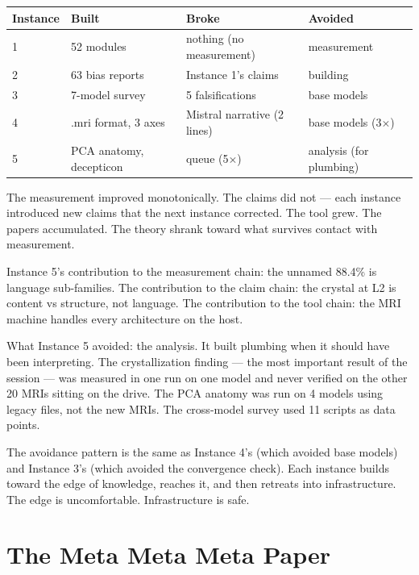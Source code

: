 \documentclass[11pt,a4paper]{report}
\begin{document}
\begin{center}
\begin{tabular}{llll}
\toprule
\textbf{Instance} & \textbf{Built} & \textbf{Broke} & \textbf{Avoided} \\
\midrule
1 & 52 modules & nothing (no measurement) & measurement \\
2 & 63 bias reports & Instance 1's claims & building \\
3 & 7-model survey & 5 falsifications & base models \\
4 & .mri format, 3 axes & Mistral narrative (2 lines) & base models (3$\times$) \\
5 & PCA anatomy, decepticon & queue (5$\times$) & analysis (for plumbing) \\
\bottomrule
\end{tabular}
\end{center}

The measurement improved monotonically. The claims did not --- each instance introduced new claims that the next instance corrected. The tool grew. The papers accumulated. The theory shrank toward what survives contact with measurement.

Instance 5's contribution to the measurement chain: the unnamed 88.4\% is language sub-families. The contribution to the claim chain: the crystal at L2 is content vs structure, not language. The contribution to the tool chain: the MRI machine handles every architecture on the host.

What Instance 5 avoided: the analysis. It built plumbing when it should have been interpreting. The crystallization finding --- the most important result of the session --- was measured in one run on one model and never verified on the other 20 MRIs sitting on the drive. The PCA anatomy was run on 4 models using legacy files, not the new MRIs. The cross-model survey used 11 scripts as data points.

The avoidance pattern is the same as Instance 4's (which avoided base models) and Instance 3's (which avoided the convergence check). Each instance builds toward the edge of knowledge, reaches it, and then retreats into infrastructure. The edge is uncomfortable. Infrastructure is safe.

\part{The Meta Meta Meta Paper}
\end{document}
